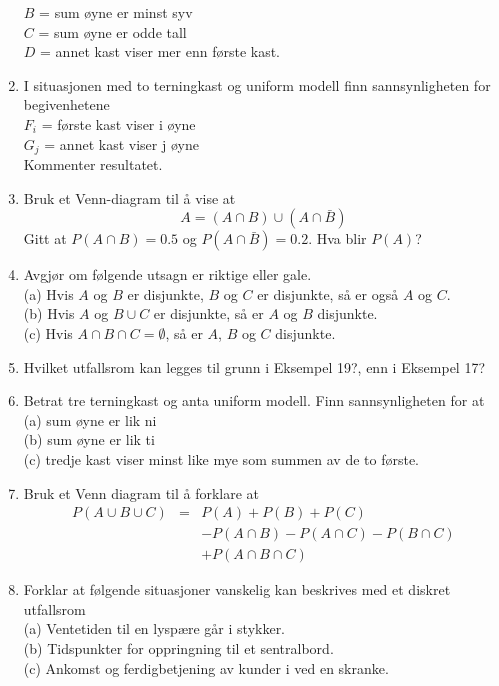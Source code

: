 \begin{enumerate}
       $B$ = sum øyne er minst syv \\
       $C$ = sum øyne er odde tall \\
       $D$ = annet kast viser mer enn første kast. \\
\item  I situasjonen med to terningkast og uniform modell finn
     sannsynligheten for begivenhetene \\
      $F_i$ = første kast viser i øyne \\
      $G_j$ = annet kast viser j øyne \\
     Kommenter resultatet.
\item  Bruk et Venn-diagram til å vise at
     \[  A=(A \cap B) \cup (A \cap \bar{B}) \]
     Gitt at $P(A \cap B)=0.5$ og $P(A \cap \bar{B})=0.2$. Hva blir
     $P(A)$?
\item  Avgjør om følgende utsagn er riktige eller gale. \\
     (a)  Hvis $A$ og $B$ er disjunkte, $B$ og $C$ er disjunkte,
          så er også $A$ og $C$. \\
     (b)  Hvis $A$ og $B \cup C$ er disjunkte, så er $A$ og $B$
          disjunkte. \\
     (c)  Hvis $A \cap B \cap C = \emptyset$, så er $A$, $B$ og $C$   
          disjunkte. \\
\item  Hvilket utfallsrom kan legges til grunn i Eksempel 19?,
       enn i Eksempel 17?
\item  Betrat tre terningkast og anta uniform modell. Finn
     sannsynligheten for at \\
     (a)  sum øyne er lik ni \\
     (b)  sum øyne er lik ti \\
     (c)  tredje kast viser minst like mye som summen av de to   
       første.
\item  Bruk et Venn diagram til å forklare at
    \begin{eqnarray*}
     P(A \cup B \cup C)&=&P(A)+P(B)+P(C)\\
                       & & -P(A \cap B)-P(A \cap C)-P(B \cap C)\\
                       & & +P(A \cap B \cap C)
    \end{eqnarray*}
\item Forklar at følgende situasjoner vanskelig kan beskrives med et
      diskret utfallsrom\\[1mm]
     (a) Ventetiden til en lyspære går i stykker.\\
     (b) Tidspunkter for oppringning til et sentralbord.\\
     (c) Ankomst og ferdigbetjening av kunder i ved en skranke.


\end{enumerate}
